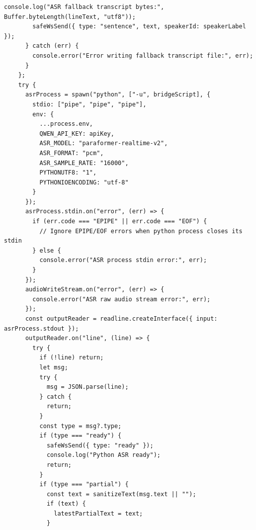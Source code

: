 \documentclass[12pt,a4paper]{article}
\begin{document}
\begin{Verbatim}[fontsize=\footnotesize]
        console.log("ASR fallback transcript bytes:", Buffer.byteLength(lineText, "utf8"));
        safeWsSend({ type: "sentence", text, speakerId: speakerLabel });
      } catch (err) {
        console.error("Error writing fallback transcript file:", err);
      }
    };
    try {
      asrProcess = spawn("python", ["-u", bridgeScript], {
        stdio: ["pipe", "pipe", "pipe"],
        env: {
          ...process.env,
          QWEN_API_KEY: apiKey,
          ASR_MODEL: "paraformer-realtime-v2",
          ASR_FORMAT: "pcm",
          ASR_SAMPLE_RATE: "16000",
          PYTHONUTF8: "1",
          PYTHONIOENCODING: "utf-8"
        }
      });
      asrProcess.stdin.on("error", (err) => {
        if (err.code === "EPIPE" || err.code === "EOF") {
          // Ignore EPIPE/EOF errors when python process closes its stdin
        } else {
          console.error("ASR process stdin error:", err);
        }
      });
      audioWriteStream.on("error", (err) => {
        console.error("ASR raw audio stream error:", err);
      });
      const outputReader = readline.createInterface({ input: asrProcess.stdout });
      outputReader.on("line", (line) => {
        try {
          if (!line) return;
          let msg;
          try {
            msg = JSON.parse(line);
          } catch {
            return;
          }
          const type = msg?.type;
          if (type === "ready") {
            safeWsSend({ type: "ready" });
            console.log("Python ASR ready");
            return;
          }
          if (type === "partial") {
            const text = sanitizeText(msg.text || "");
            if (text) {
              latestPartialText = text;
            }
\end{Verbatim}
\newpage
{}
\fancyhead[R]{}
\end{document}
